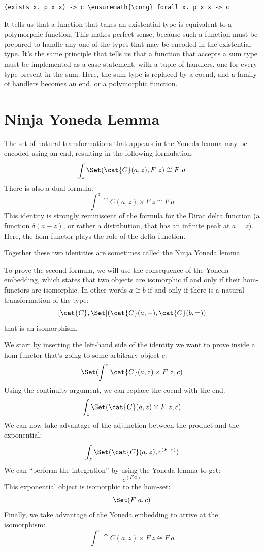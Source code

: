 \begin{Verbatim}[commandchars=\\\{\}]
(exists x. p x x) -> c \ensuremath{\cong} forall x. p x x -> c
\end{Verbatim}
It tells us that a function that takes an existential type is equivalent
to a polymorphic function. This makes perfect sense, because such a
function must be prepared to handle any one of the types that may be
encoded in the existential type. It's the same principle that tells us
that a function that accepts a sum type must be implemented as a case
statement, with a tuple of handlers, one for every type present in the
sum. Here, the sum type is replaced by a coend, and a family of handlers
becomes an end, or a polymorphic function.

\section{Ninja Yoneda Lemma}

The set of natural transformations that appears in the Yoneda lemma may
be encoded using an end, resulting in the following formulation:
\[\int_z \Set(\cat{C}(a, z), F\ z) \cong F\ a\]
There is also a dual formula:
\[\int^z \cat{C}(a, z)\times{}F\ z \cong F\ a\]
This identity is strongly reminiscent of the formula for the Dirac delta
function (a function $\delta(a - z)$, or rather a distribution, that
has an infinite peak at $a = z$). Here, the hom-functor plays
the role of the delta function.

Together these two identities are sometimes called the Ninja Yoneda
lemma.

To prove the second formula, we will use the consequence of the Yoneda
embedding, which states that two objects are isomorphic if and only if
their hom-functors are isomorphic. In other words $a \cong b$ if
and only if there is a natural transformation of the type:
\[[\cat{C}, \Set](\cat{C}(a, -), \cat{C}(b, =))\]
that is an isomorphism.

We start by inserting the left-hand side of the identity we want to
prove inside a hom-functor that's going to some arbitrary object
$c$:
\[\Set(\int^z \cat{C}(a, z)\times{}F\ z, c)\]
Using the continuity argument, we can replace the coend with the end:
\[\int_z \Set(\cat{C}(a, z)\times{}F\ z, c)\]
We can now take advantage of the adjunction between the product and the
exponential:
\[\int_z \Set(\cat{C}(a, z), c^{(F\ z)})\]
We can ``perform the integration'' by using the Yoneda lemma to get:
\[c^{(F\ a)}\]
This exponential object is isomorphic to the hom-set:
\[\Set(F\ a, c)\]
Finally, we take advantage of the Yoneda embedding to arrive at the
isomorphism:
\[\int^z \cat{C}(a, z)\times{}F\ z \cong F\ a\]

